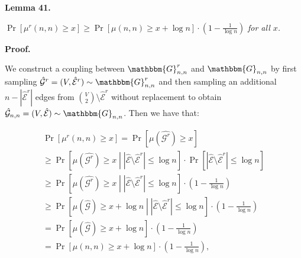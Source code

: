 \documentclass[10pt,a4paper]{article}
\begin{document}


\par\medskip\noindent\textbf{\textbf{Lemma 41}\textbf{.}}\par



$\Pr\left[\mu^{r}(n,n)\geq x\right]\geq\Pr\left[\mu(n,n)\geq x+\log{n}\right]\cdot\left(1-\frac{1}{\log{n}}\right)$\emph{ for all $x$.}\par






\par\medskip\noindent\textbf{Proof.}\par



We construct a coupling between $\mathbbm{G}^{r}_{n,n}$ and $\mathbbm{G}_{n,n}$ by first sampling $\hat{\mathcal{G}}^{r}=(V,\hat{\mathcal{E}}^{r})\sim\mathbbm{G}^{r}_{n,n}$ and then sampling an additional $n-|\hat{\mathcal{E}}^{r}|$ edges from $\binom{V}{2}\setminus\hat{\mathcal{E}}^{r}$ without replacement to obtain $\hat{\mathcal{G}}_{n,n}=(V,\hat{\mathcal{E}})\sim\mathbbm{G}_{n,n}$.
Then we have that:\par


\[\begin{gathered}
\displaystyle\Pr\left[\mu^{r}(n,n)\geq x\right] \displaystyle=\Pr\left[\mu(\hat{\mathcal{G}^{r}})\geq x\right] \\
\displaystyle\geq\Pr\left[\mu(\hat{\mathcal{G}^{r}})\geq x\middle||\hat{\mathcal{E}}\setminus\hat{\mathcal{E}}^{r}|\leq\log{n}\right]\cdot\Pr\left[|\hat{\mathcal{E}}\setminus\hat{\mathcal{E}}^{r}|\leq\log{n}\right] \\
\displaystyle\geq\Pr\left[\mu(\hat{\mathcal{G}^{r}})\geq x\middle||\hat{\mathcal{E}}\setminus\hat{\mathcal{E}}^{r}|\leq\log{n}\right]\cdot\left(1-\frac{1}{\log{n}}\right) \\
\displaystyle\geq\Pr\left[\mu(\hat{\mathcal{G}})\geq x+\log{n}\middle||\hat{\mathcal{E}}\setminus\hat{\mathcal{E}}^{r}|\leq\log{n}\right]\cdot\left(1-\frac{1}{\log{n}}\right) \\
\displaystyle=\Pr\left[\mu(\hat{\mathcal{G}})\geq x+\log{n}\right]\cdot\left(1-\frac{1}{\log{n}}\right) \\
\displaystyle=\Pr\left[\mu(n,n)\geq x+\log{n}\right]\cdot\left(1-\frac{1}{\log{n}}\right),
\end{gathered}\]
\end{document}
